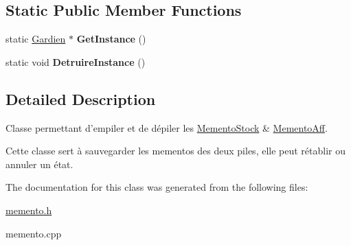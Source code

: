 \subsection*{Static Public Member Functions}
\begin{DoxyCompactItemize}
\item 
\hypertarget{class_gardien_a4b27ca18c44dabd54b0c917d0507d6ba}{static \hyperlink{class_gardien}{Gardien} $\ast$ {\bfseries Get\-Instance} ()}\label{class_gardien_a4b27ca18c44dabd54b0c917d0507d6ba}

\item 
\hypertarget{class_gardien_a0fb33b3613867d0ee2dee53b73faeec6}{static void {\bfseries Detruire\-Instance} ()}\label{class_gardien_a0fb33b3613867d0ee2dee53b73faeec6}

\end{DoxyCompactItemize}


\subsection{Detailed Description}
Classe permettant d'empiler et de dépiler les \hyperlink{class_memento_stock}{Memento\-Stock} \& \hyperlink{class_memento_aff}{Memento\-Aff}. 

Cette classe sert à sauvegarder les mementos des deux piles, elle peut rétablir ou annuler un état. 

The documentation for this class was generated from the following files\-:\begin{DoxyCompactItemize}
\item 
\hyperlink{memento_8h}{memento.\-h}\item 
memento.\-cpp\end{DoxyCompactItemize}
